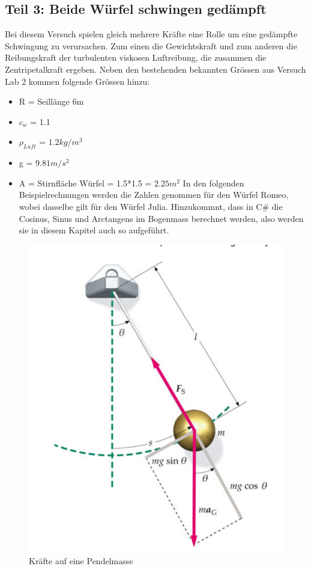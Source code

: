 \documentclass[../main.tex]{subfiles}
\begin{document}
\subsection{Teil 3: Beide Würfel schwingen gedämpft}
Bei diesem Versuch spielen gleich mehrere Kräfte eine Rolle um eine gedämpfte Schwingung zu verursachen. Zum einen die Gewichtskraft und zum anderen die Reibungskraft der turbulenten viskosen Luftreibung, die zusammen die Zentripetalkraft ergeben.
Neben den bestehenden bekannten Grössen aus Versuch Lab 2 kommen folgende Grössen hinzu:
\begin{itemize}
	\item R = Seillänge 6m
	\item $c_w$ = 1.1
	\item $\rho_{Luft}$ = $1.2kg/m^3$
	\item g = $9.81 m/s^2$
	\item A = Stirnfläche Würfel = 1.5*1.5 = $2.25m^2$\newline
In den folgenden Beispielrechnungen werden die Zahlen genommen für den Würfel Romeo, wobei dasselbe gilt für den Würfel Julia. 	Hinzukommnt, dass in C\# die Cosinus, Sinus und Arctangens im Bogenmass berechnet werden, also werden sie in diesem Kapitel auch so aufgeführt.
\end{itemize}
     \begin{figure}[H]
               \begin{center}
                   \centerline{\includegraphics[width=155mm]{./images/Lab3Unity/KraeftePendel.png}}
                   \caption{Kräfte auf eine Pendelmasse \cite{tiplerpaula.PhysikFurStudierende}}
                   \label{fig:Pendel}
               \end{center}
     \end{figure}
\end{document}
